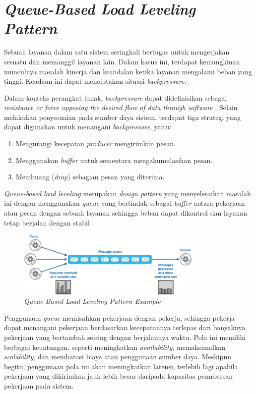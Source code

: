 \section{\textit{Queue-Based Load Leveling Pattern}}

Sebuah layanan dalam satu sistem seringkali bertugas untuk mengerjakan sesuatu dan memanggil layanan lain. Dalam kasus ini, terdapat kemungkinan munculnya masalah kinerja dan keandalan ketika layanan mengalami beban yang tinggi. Keadaan ini dapat menciptakan situasi \textit{backpressure}.

Dalam konteks perangkat lunak, \textit{backpressure} dapat didefinisikan sebagai \textit{resistance or force opposing the desired flow of data through software} \parencite{backpressureExplained}. Selain melakukan penyesuaian pada sumber daya sistem, terdapat tiga strategi yang dapat digunakan untuk menangani \textit{backpressure}, yaitu:

\begin{enumerate}
    \item Mengurangi kecepatan \textit{producer} mengirimkan pesan.
    \item Menggunakan \textit{buffer} untuk sementara mengakumulasikan pesan.
    \item Membuang (\textit{drop}) sebagian pesan yang diterima.
\end{enumerate}

\textit{Queue-based load leveling} merupakan \textit{design pattern} yang menyelesaikan masalah ini dengan menggunakan \textit{queue} yang bertindak sebagai \textit{buffer} antara pekerjaan atau pesan dengan sebuah layanan sehingga beban dapat dikontrol dan layanan tetap berjalan dengan stabil \parencite{queueLoadLeveling}.

\begin{figure}[ht]
    \centering
    \includegraphics[width=0.8\textwidth]{resources/chapter-2/queue-based-load-leveling-pattern.png}
    \caption{\textit{Queue-Based Load Leveling Pattern Example} \parencite{queueLoadLeveling}}
    \label{fig:queue-based-load-leveling-pattern}
\end{figure}

Penggunaan \textit{queue} memisahkan pekerjaan dengan pekerja, sehingga pekerja dapat menangani pekerjaan berdasarkan kecepatannya terlepas dari banyaknya pekerjaan yang bertambah seiring dengan berjalannya waktu. Pola ini memiliki berbagai keuntungan, seperti meningkatkan \textit{availability}, memaksimalkan \textit{scalability}, dan membatasi biaya atau penggunaan sumber daya. Meskipun begitu, penggunaan pola ini akan meningkatkan latensi, terlebih lagi apabila pekerjaan yang dikirimkan jauh lebih besar daripada kapasitas pemrosesan pekerjaan pada sistem.